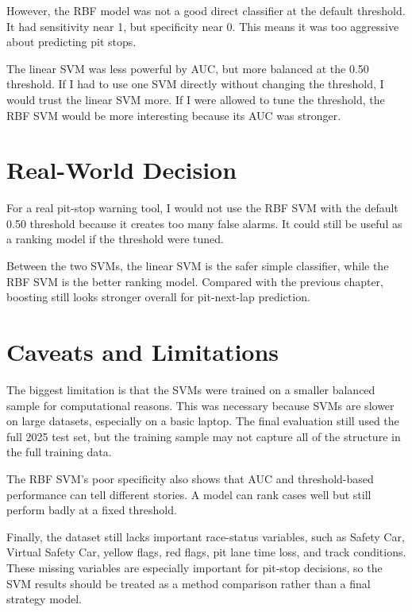 \documentclass[11pt,oneside,openany]{book}
\begin{document}
However, the RBF model was not a good direct classifier at the default threshold. It had sensitivity near 1, but specificity near 0. This means it was too aggressive about predicting pit stops.

The linear SVM was less powerful by AUC, but more balanced at the 0.50 threshold. If I had to use one SVM directly without changing the threshold, I would trust the linear SVM more. If I were allowed to tune the threshold, the RBF SVM would be more interesting because its AUC was stronger.

\section{Real-World Decision}

For a real pit-stop warning tool, I would not use the RBF SVM with the default 0.50 threshold because it creates too many false alarms. It could still be useful as a ranking model if the threshold were tuned.

Between the two SVMs, the linear SVM is the safer simple classifier, while the RBF SVM is the better ranking model. Compared with the previous chapter, boosting still looks stronger overall for pit-next-lap prediction.

\section{Caveats and Limitations}

The biggest limitation is that the SVMs were trained on a smaller balanced sample for computational reasons. This was necessary because SVMs are slower on large datasets, especially on a basic laptop. The final evaluation still used the full 2025 test set, but the training sample may not capture all of the structure in the full training data.

The RBF SVM's poor specificity also shows that AUC and threshold-based performance can tell different stories. A model can rank cases well but still perform badly at a fixed threshold.

Finally, the dataset still lacks important race-status variables, such as Safety Car, Virtual Safety Car, yellow flags, red flags, pit lane time loss, and track conditions. These missing variables are especially important for pit-stop decisions, so the SVM results should be treated as a method comparison rather than a final strategy model.

\end{document}
